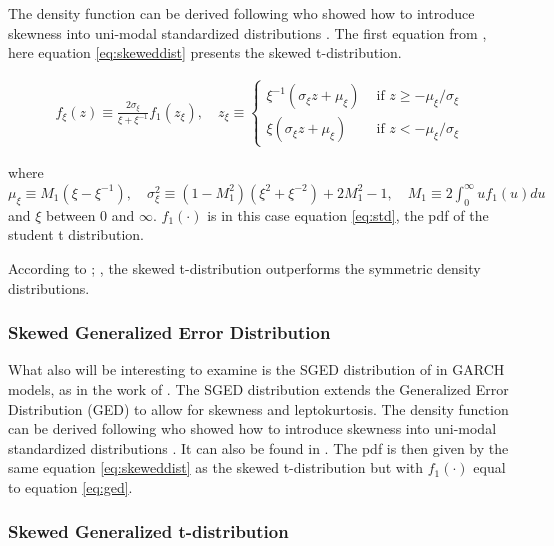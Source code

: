 \documentclass[a4paper, twoside]{templates/ociamthesis}
\begin{document}
\noindent The density function can be derived following \textcite{fernández1998} who showed how to introduce skewness into uni-modal standardized distributions \autocite{trottier2015}. The first equation from \textcite{trottier2015}, here equation \eqref{eq:skeweddist} presents the skewed t-distribution.

\begin{align}
f_{\xi}(z) \equiv \frac{2 \sigma_{\xi}}{\xi+\xi^{-1}} f_{1}\left(z_{\xi}\right), \quad z_{\xi} \equiv\left\{\begin{array}{ll}
\xi^{-1}\left(\sigma_{\xi} z+\mu_{\xi}\right) & \text { if } z \geq-\mu_{\xi} / \sigma_{\xi} \\
\xi\left(\sigma_{\xi} z+\mu_{\xi}\right) & \text { if } z<-\mu_{\xi} / \sigma_{\xi}
\end{array}\right.
 \label{eq:skeweddist}
\end{align}

\noindent where \(\mu_{\xi} \equiv M_{1}\left(\xi-\xi^{-1}\right), \quad \sigma_{\xi}^{2} \equiv\left(1-M_{1}^{2}\right)\left(\xi^{2}+\xi^{-2}\right)+2 M_{1}^{2}-1, \quad M_{1} \equiv 2 \int_{0}^{\infty} u f_{1}(u) d u\) and \(\xi\) between \(0\) and \(\infty\). \(f_1(\cdot)\) is in this case equation \eqref{eq:std}, the pdf of the student t distribution.

\noindent According to \textcite{giot2003}; \textcite{giot2004}, the skewed t-distribution outperforms the symmetric density distributions.

\hypertarget{skewed-generalized-error-distribution}{%
\subsubsection{Skewed Generalized Error Distribution}\label{skewed-generalized-error-distribution}}

\noindent What also will be interesting to examine is the SGED distribution of \textcite{theodossiou2000} in GARCH models, as in the work of \textcite{lee2008}. The SGED distribution extends the Generalized Error Distribution (GED) to allow for skewness and leptokurtosis. The density function can be derived following \textcite{fernández1998} who showed how to introduce skewness into uni-modal standardized distributions \autocite{trottier2015}. It can also be found in \textcite{theodossiou2000}. The pdf is then given by the same equation \eqref{eq:skeweddist} as the skewed t-distribution but with \(f_1(\cdot)\) equal to equation \eqref{eq:ged}.

\hypertarget{skewed-generalized-t-distribution}{%
\subsubsection{Skewed Generalized t-distribution}\label{skewed-generalized-t-distribution}}
\end{document}
